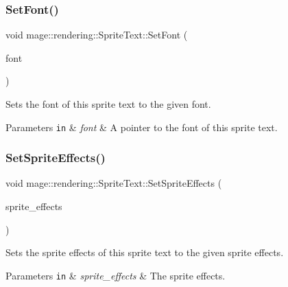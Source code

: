 \subsubsection{\texorpdfstring{Set\+Font()}{SetFont()}}
{\footnotesize\ttfamily void mage\+::rendering\+::\+Sprite\+Text\+::\+Set\+Font (\begin{DoxyParamCaption}\item[{\mbox{\hyperlink{namespacemage_1_1rendering_ab2f34196c20422ca3692ad3f3bff3a5d}{Sprite\+Font\+Ptr}}}]{font }\end{DoxyParamCaption})\hspace{0.3cm}{\ttfamily [noexcept]}}

Sets the font of this sprite text to the given font.


\begin{DoxyParams}[1]{Parameters}
\mbox{\tt in}  & {\em font} & A pointer to the font of this sprite text. \\
\hline
\end{DoxyParams}
\mbox{\label{classmage_1_1rendering_1_1_sprite_text_a0d2f1e88db1e1fec1b7c6b2563ef7271}} 
\subsubsection{\texorpdfstring{Set\+Sprite\+Effects()}{SetSpriteEffects()}}
{\footnotesize\ttfamily void mage\+::rendering\+::\+Sprite\+Text\+::\+Set\+Sprite\+Effects (\begin{DoxyParamCaption}\item[{\mbox{\hyperlink{namespacemage_1_1rendering_a4dbc3536c87b906f1d41d863ec458e78}{Sprite\+Effect}}}]{sprite\+\_\+effects }\end{DoxyParamCaption})\hspace{0.3cm}{\ttfamily [noexcept]}}

Sets the sprite effects of this sprite text to the given sprite effects.


\begin{DoxyParams}[1]{Parameters}
\mbox{\tt in}  & {\em sprite\+\_\+effects} & The sprite effects. \\
\hline
\end{DoxyParams}
\mbox{\label{classmage_1_1rendering_1_1_sprite_text_a3e7bc7515af8cb92351b0bef475e7dbe}} 
